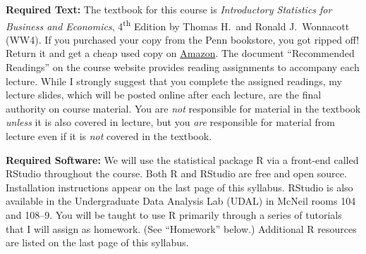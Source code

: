 \documentclass[11pt, letterpaper]{article}
\begin{document}
\medskip

\noindent \textbf{Required Text:} 
The textbook for this course is \emph{Introductory Statistics for Business and Economics}, 4\textsuperscript{th} Edition by Thomas H.\ and Ronald J.\ Wonnacott (WW4). 
If you purchased your copy from the Penn bookstore, you got ripped off! Return it and get a cheap used copy on \href{http://tinyurl.com/ECON103-2013A}{Amazon}.
The document ``Recommended Readings'' on the course website provides reading assignments to accompany each lecture.
While I strongly suggest that you complete the assigned readings, my lecture slides, which will be posted online after each lecture, are the final authority on course material. 
You are \emph{not} responsible for material in the textbook \emph{unless} it is also covered in lecture, but you \emph{are} responsible for material from lecture even if it is \emph{not} covered in the textbook.

\medskip


%


\noindent \textbf{Required Software:} 
We will use the statistical package R via a front-end called RStudio throughout the course. 
Both R and RStudio are free and open source. Installation instructions appear on the last page of this syllabus.
RStudio is also available in the Undergraduate Data Analysis Lab (UDAL) in McNeil rooms 104 and 108--9. 
You will be taught to use R primarily through a series of tutorials that I will assign as homework. (See ``Homework'' below.)  
Additional R resources are listed on the last page of this syllabus.
\end{document}
